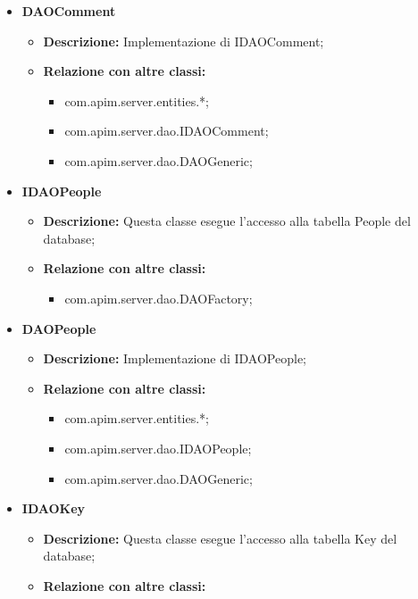 {{{{{\begin{itemize}
          \item \textbf{DAOComment}
          \begin{itemize}
            \item \textbf{Descrizione:} Implementazione di IDAOComment;
            \item \textbf{Relazione con altre classi:}
            \begin{itemize}
              \item com.apim.server.entities.*;
              \item com.apim.server.dao.IDAOComment;
              \item com.apim.server.dao.DAOGeneric;
            \end{itemize}
          \end{itemize}
           \item \textbf{IDAOPeople}
          \begin{itemize}
            \item \textbf{Descrizione:} Questa classe esegue l'accesso alla tabella People del database;
            \item \textbf{Relazione con altre classi:}
            \begin{itemize}
              \item com.apim.server.dao.DAOFactory;
            \end{itemize}
          \end{itemize}
          \item \textbf{DAOPeople}
          \begin{itemize}
            \item \textbf{Descrizione:} Implementazione di IDAOPeople;
            \item \textbf{Relazione con altre classi:}
            \begin{itemize}
              \item com.apim.server.entities.*;
              \item com.apim.server.dao.IDAOPeople;
              \item com.apim.server.dao.DAOGeneric;
            \end{itemize}
          \end{itemize}
          \item \textbf{IDAOKey}
          \begin{itemize}
            \item \textbf{Descrizione:} Questa classe esegue l'accesso alla tabella Key del database;
            \item \textbf{Relazione con altre classi:}

\end{itemize}
\end{itemize}}}}}}
